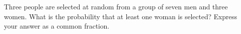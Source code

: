 Three people are selected at random from a group of seven men and three women. What is the probability that at least one woman is selected? Express your answer as a common fraction.
